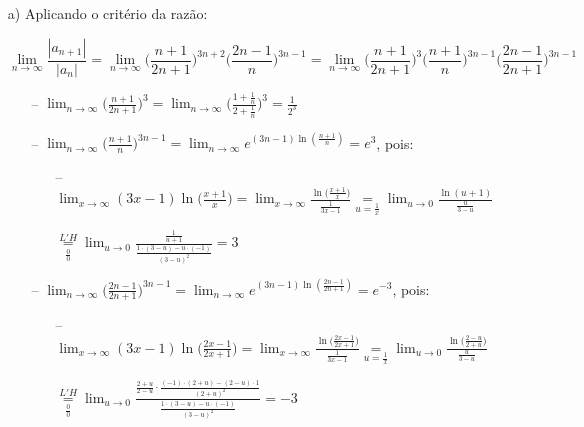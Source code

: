 \documentclass[12pt,a4paper]{article}
\begin{document}
\begin{itemize}
\item[a)] Aplicando o critério da razão:

$$\lim_{n\rightarrow\infty} \frac{|a_{n+1}|}{|a_n|} = \lim_{n\rightarrow\infty} \Big( \frac{n+1}{2n+1} \Big)^{3n+2} \Big( \frac{2n-1}{n} \Big)^{3n-1} = \lim_{n\rightarrow\infty}  \Big( \frac{n+1}{2n+1} \Big)^3 \Big( \frac{n+1}{n} \Big)^{3n-1} \Big( \frac{2n-1}{2n+1} \Big)^{3n-1} $$

\begin{itemize}
\item[--] $\displaystyle\lim_{n\rightarrow\infty}  \Big( \displaystyle\frac{n+1}{2n+1} \Big)^3 = \displaystyle\lim_{n\rightarrow\infty}  \Big( \displaystyle\frac{1+\frac{1}{n}}{2+\frac{1}{n}} \Big)^3 = \displaystyle\frac{1}{2^3} $
\item[--] $\displaystyle\lim_{n\rightarrow\infty} \Big( \displaystyle\frac{n+1}{n} \Big)^{3n-1} = \displaystyle\lim_{n\rightarrow\infty} e^{(3n-1) \ln(\frac{n+1}{n})} = e^3$, pois:
\begin{itemize}
\item[--] $\displaystyle\lim_{x\rightarrow\infty} (3x-1) \ln\Big(\frac{x+1}{x}\Big) = \displaystyle\lim_{x\rightarrow\infty} \frac{ \ln\big(\frac{x+1}{x}\big) }{\frac{1}{3x-1}} \underset{u = \frac{1}{x}}{=} \displaystyle\lim_{u\rightarrow 0} \frac{ \ln(u+1) }{\frac{u}{3-u}}$

$\underset{\frac{0}{0}}{\overset{L'H}{=}} \displaystyle\lim_{u\rightarrow 0} \displaystyle \frac{\frac{1}{u+1}}{\frac{1\cdot(3-u)-u\cdot(-1)}{(3-u)^2}}=3$
\end{itemize}
\item[--] $\displaystyle\lim_{n\rightarrow\infty} \Big( \displaystyle\frac{2n-1}{2n+1} \Big)^{3n-1} = \displaystyle\lim_{n\rightarrow\infty} e^{(3n-1) \ln(\frac{2n-1}{2n+1})} = e^{-3}$, pois:
\begin{itemize}
\item[--] $\displaystyle\lim_{x\rightarrow\infty} (3x-1) \ln\Big(\frac{2x-1}{2x+1}\Big) = \displaystyle\lim_{x\rightarrow\infty} \frac{ \ln\big(\frac{2x-1}{2x+1}\big) }{\frac{1}{3x-1}} \underset{u = \frac{1}{x}}{=} \displaystyle\lim_{u\rightarrow 0} \frac{ \ln\big(\frac{2-u}{2+u}\big) }{\frac{u}{3-u}}$

$\underset{\frac{0}{0}}{\overset{L'H}{=}} \displaystyle\lim_{u\rightarrow 0} \displaystyle \frac{\frac{2+u}{2-u} \cdot \frac{(-1)\cdot(2+u)-(2-u)\cdot 1}{(2+u)^2}}{\frac{1\cdot(3-u)-u\cdot(-1)}{(3-u)^2}}= -3$
\end{itemize}
\end{itemize}


\end{itemize}
\end{document}

